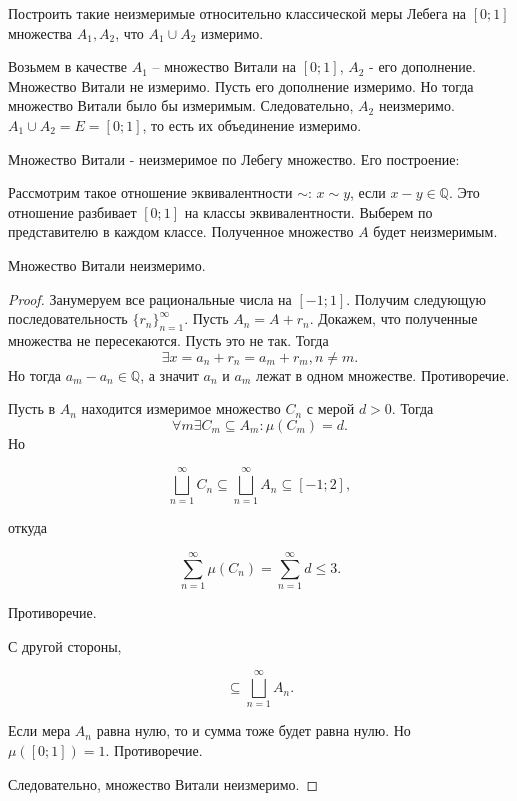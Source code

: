 \begin{task}{7}
Построить такие неизмеримые относительно классической меры Лебега на $[0;1]$ множества $A_1, A_2$, что $A_1 \cup A_2$ измеримо.
\end{task}
\begin{solution}
Возьмем в качестве $A_1$ -- множество Витали на $[0;1]$, $A_2$ - его дополнение. Множество Витали не измеримо. Пусть его дополнение измеримо. Но тогда множество Витали было бы измеримым. Следовательно, $A_2$ неизмеримо. $A_1 \cup A_2 = E = [0;1]$, то есть их объединение измеримо.

\begin{definition}
Множество Витали - неизмеримое по Лебегу множество. Его построение:

Рассмотрим такое отношение эквивалентности $\sim$: $x \sim y$, если $x - y \in \mathbb{Q}$. Это отношение разбивает $[0;1]$ на классы эквивалентности. Выберем по представителю в каждом классе. Полученное множество $A$ будет неизмеримым.
\end{definition}

\begin{proposition}
Множество Витали неизмеримо.
\end{proposition}
\begin{proof}
Занумеруем все рациональные числа на $[-1;1]$. Получим следующую последовательность $\{r_n\}_{n=1}^{\infty}$. Пусть $A_n = A + r_n$. Докажем, что полученные множества не пересекаются. Пусть это не так. Тогда 
\begin{equation}
    \exists x = a_n + r_n = a_m + r_m, n \not = m.
\end{equation}
Но тогда $a_m - a_n \in \mathbb{Q}$, а значит $a_n$ и $a_m$ лежат в одном множестве. Противоречие.

Пусть в $A_n$ находится измеримое множество $C_n$ с мерой $d > 0$. Тогда
\begin{equation}
    \forall m \exists C_m \subseteq A_m: \mu(C_m) = d.
\end{equation}
Но 

\begin{equation}
    \bigsqcup_{n=1}^{\infty}{C_n} \subseteq \bigsqcup_{n=1}^{\infty}{A_n} \subseteq [-1; 2],
\end{equation}

откуда

\begin{equation}
    \sum_{n=1}^{\infty}{\mu(C_n)} = \sum_{n=1}^{\infty}{d} \leq 3.
\end{equation}

Противоречие.

С другой стороны,

\begin{equation}
    [0;1] \subseteq \bigsqcup_{n=1}^{\infty}{A_n}.
\end{equation}

Если мера $A_n$ равна нулю, то и сумма тоже будет равна нулю. Но $\mu([0;1]) = 1$. Противоречие.

Следовательно, множество Витали неизмеримо.

\end{proof}

\end{solution}

